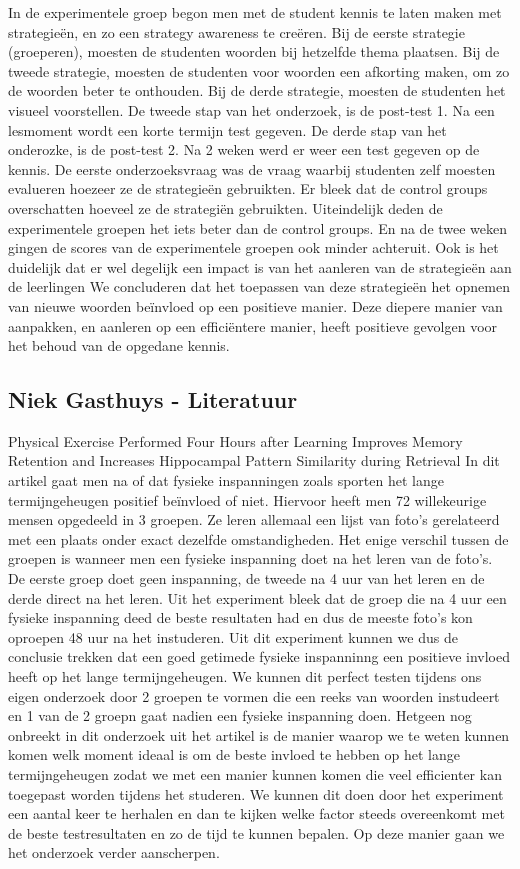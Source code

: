 \documentclass{voorstel}
\begin{document}
	In de experimentele groep begon men met de student kennis te laten maken met strategieën, en zo een strategy awareness te creëren. Bij de eerste strategie (groeperen), moesten de studenten woorden bij hetzelfde thema plaatsen. Bij de tweede strategie, moesten de studenten voor woorden een afkorting maken, om zo de woorden beter te onthouden. Bij de derde strategie, moesten de studenten het visueel voorstellen.
	De tweede stap van het onderzoek, is de post-test 1. Na een lesmoment wordt een korte termijn test gegeven.
	De derde stap van het onderozke, is de post-test 2. Na 2 weken werd er weer een test gegeven op de kennis.
	De eerste onderzoeksvraag was de vraag waarbij studenten zelf moesten evalueren hoezeer ze de strategieën gebruikten. Er bleek dat de control groups overschatten hoeveel ze de strategiën gebruikten. Uiteindelijk deden de experimentele groepen het iets beter dan de control groups. En na de twee weken gingen de scores van de experimentele groepen ook minder achteruit.
	Ook is het duidelijk dat er wel degelijk een impact is van het aanleren van de strategieën aan de leerlingen
	We concluderen dat het toepassen van deze strategieën het opnemen van nieuwe woorden beïnvloed op een positieve manier. Deze diepere manier van aanpakken, en aanleren op een efficiëntere manier, heeft positieve gevolgen voor het behoud van de opgedane kennis.
	
	\subsection{Niek Gasthuys - Literatuur}
	
	Physical Exercise Performed Four Hours after Learning Improves Memory Retention and Increases Hippocampal Pattern Similarity during Retrieval \autocite{Drongen2016}
	In dit artikel gaat men na of dat fysieke inspanningen zoals sporten het lange termijngeheugen positief beïnvloed of niet. Hiervoor heeft men 72 willekeurige mensen opgedeeld in 3 groepen. Ze leren allemaal een lijst van foto’s gerelateerd met een plaats onder exact dezelfde omstandigheden. Het enige verschil tussen de groepen is wanneer men een fysieke inspanning doet na het leren van de foto’s. De eerste groep doet geen inspanning, de tweede na 4 uur van het leren en de derde direct na het leren. Uit het experiment bleek dat de groep die na 4 uur een fysieke inspanning deed de beste resultaten had en dus de meeste foto’s kon oproepen 48 uur na het instuderen. Uit dit experiment kunnen we dus de conclusie trekken dat een goed getimede fysieke inspanninng een positieve invloed heeft op het lange termijngeheugen. We kunnen dit perfect testen tijdens ons eigen onderzoek door 2 groepen te vormen die een reeks van woorden instudeert en 1 van de 2 groepn gaat nadien een fysieke inspanning doen. Hetgeen nog onbreekt in dit onderzoek uit het artikel is de manier waarop we te weten kunnen komen welk moment ideaal is om de beste invloed te hebben op het lange termijngeheugen zodat we met een manier kunnen komen die veel efficienter kan toegepast worden tijdens het studeren. We kunnen dit doen door het experiment een aantal keer te herhalen en dan te kijken welke factor steeds overeenkomt met de beste testresultaten en zo de tijd te kunnen bepalen. Op deze manier gaan we het onderzoek verder aanscherpen.
	
\end{document}
